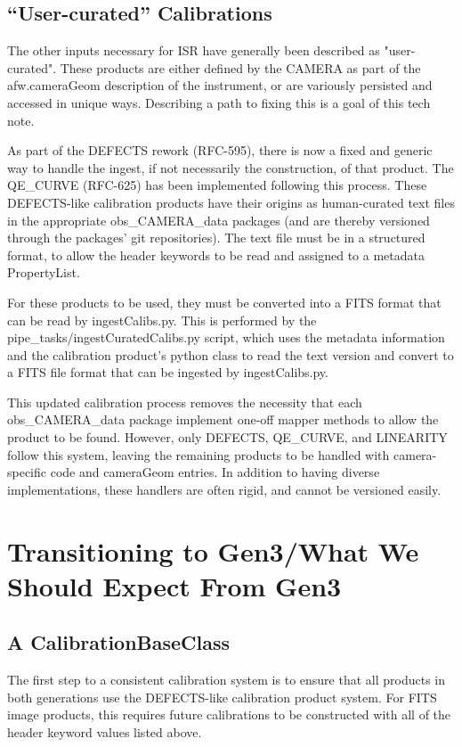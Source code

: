 \documentclass[DM,authoryear,toc]{lsstdoc}
\begin{document}
\subsection{``User-curated'' Calibrations}

The other inputs necessary for ISR have generally been described as
"user-curated".  These products are either defined by the CAMERA as
part of the afw.cameraGeom description of the instrument, or are
variously persisted and accessed in unique ways.  Describing a path to
fixing this is a goal of this tech note.

As part of the DEFECTS rework (RFC-595), there is now a fixed and
generic way to handle the ingest, if not necessarily the construction,
of that product.  The QE_CURVE (RFC-625) has been implemented
following this process.  These DEFECTS-like calibration products have
their origins as human-curated text files in the appropriate
obs_CAMERA_data packages (and are thereby versioned through the
packages' git repositories).  The text file must be in a structured
format, to allow the header keywords to be read and assigned to a
metadata PropertyList.

For these products to be used, they must be converted into a FITS
format that can be read by ingestCalibs.py.  This is performed by the
pipe_tasks/ingestCuratedCalibs.py script, which uses the metadata
information and the calibration product's python class to read the
text version and convert to a FITS file format that can be ingested by
ingestCalibs.py.

This updated calibration process removes the necessity that each
obs_CAMERA_data package implement one-off mapper methods to allow the
product to be found.  However, only DEFECTS, QE_CURVE, and LINEARITY
follow this system, leaving the remaining products to be handled with
camera-specific code and cameraGeom entries.  In addition to having
diverse implementations, these handlers are often rigid, and cannot be
versioned easily.

\section{Transitioning to Gen3/What We Should Expect From Gen3}

\subsection{A CalibrationBaseClass}
The first step to a consistent calibration system is to ensure that
all products in both generations use the DEFECTS-like calibration
product system.  For FITS image products, this requires future
calibrations to be constructed with all of the header keyword values
listed above.
\end{document}
